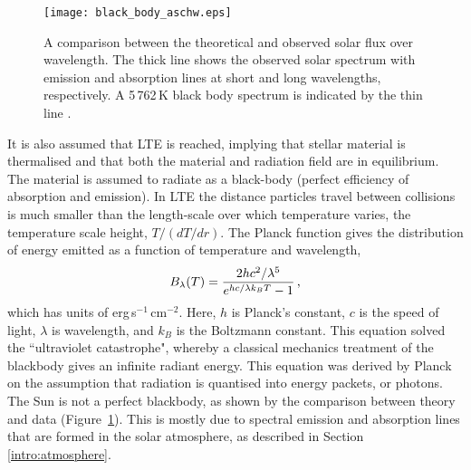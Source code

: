 
\begin{figure}[!t]
\centerline{\texttt{[image: black\_body\_aschw.eps]}}
\caption[A comparison between the theoretical and observed solar flux.]{A comparison between the theoretical and observed solar flux over wavelength. The thick line shows the observed solar spectrum with emission and absorption lines at short and long wavelengths, respectively. A 5\,762\,K black body spectrum is indicated by the thin line \citep[from][]{Aschwanden:2005}.}\label{fig:blackbodydata}
\end{figure}

It is also assumed that \gls{LTE} is reached, implying that stellar material is thermalised and that both the material and radiation field are in equilibrium. The material is assumed to radiate as a black-body (perfect efficiency of absorption and emission). In \gls{LTE} the distance particles travel between collisions is much smaller than the length-scale over which temperature varies, the temperature scale height, $T/(dT/dr)$. The Planck function gives the distribution of energy emitted as a function of temperature and wavelength,
\begin{equation}\label{eqn:bbspec}
B_\lambda(T)=\frac{2hc^2/\lambda^5}{e^{hc/\lambda k_B T}-1} \mbox{\,,} 
\end{equation} 
which has units of erg\,s$^{-1}$\,cm$^{-2}$. Here, $h$ is Planck's constant, $c$ is the speed of light, $\lambda$ is wavelength, and $k_B$ is the Boltzmann constant. This equation solved the ``ultraviolet catastrophe", whereby a classical mechanics treatment of the blackbody gives an infinite radiant energy. This equation was derived by Planck on the assumption that radiation is quantised into energy packets, or photons. The Sun is not a perfect blackbody, as shown by the comparison between theory and data (Figure~\ref{fig:blackbodydata}). This is mostly due to spectral emission and absorption lines that are formed in the solar atmosphere, as described in Section \ref{intro:atmosphere}. 

